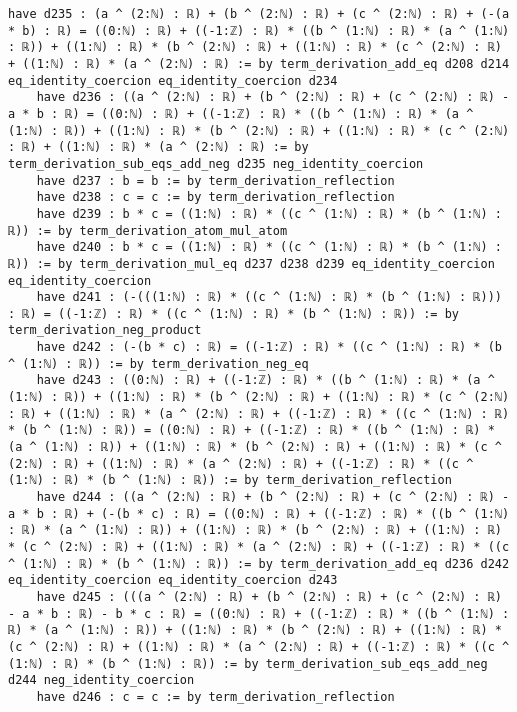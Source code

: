 \documentclass{article}
\begin{document}
\begin{tcolorbox}[colback=white!10, width=\linewidth]
\begin{lstlisting}[language=Lean4]
    have d235 : (a ^ (2:ℕ) : ℝ) + (b ^ (2:ℕ) : ℝ) + (c ^ (2:ℕ) : ℝ) + (-(a * b) : ℝ) = ((0:ℕ) : ℝ) + ((-1:ℤ) : ℝ) * ((b ^ (1:ℕ) : ℝ) * (a ^ (1:ℕ) : ℝ)) + ((1:ℕ) : ℝ) * (b ^ (2:ℕ) : ℝ) + ((1:ℕ) : ℝ) * (c ^ (2:ℕ) : ℝ) + ((1:ℕ) : ℝ) * (a ^ (2:ℕ) : ℝ) := by term_derivation_add_eq d208 d214 eq_identity_coercion eq_identity_coercion d234
    have d236 : ((a ^ (2:ℕ) : ℝ) + (b ^ (2:ℕ) : ℝ) + (c ^ (2:ℕ) : ℝ) - a * b : ℝ) = ((0:ℕ) : ℝ) + ((-1:ℤ) : ℝ) * ((b ^ (1:ℕ) : ℝ) * (a ^ (1:ℕ) : ℝ)) + ((1:ℕ) : ℝ) * (b ^ (2:ℕ) : ℝ) + ((1:ℕ) : ℝ) * (c ^ (2:ℕ) : ℝ) + ((1:ℕ) : ℝ) * (a ^ (2:ℕ) : ℝ) := by term_derivation_sub_eqs_add_neg d235 neg_identity_coercion
    have d237 : b = b := by term_derivation_reflection
    have d238 : c = c := by term_derivation_reflection
    have d239 : b * c = ((1:ℕ) : ℝ) * ((c ^ (1:ℕ) : ℝ) * (b ^ (1:ℕ) : ℝ)) := by term_derivation_atom_mul_atom
    have d240 : b * c = ((1:ℕ) : ℝ) * ((c ^ (1:ℕ) : ℝ) * (b ^ (1:ℕ) : ℝ)) := by term_derivation_mul_eq d237 d238 d239 eq_identity_coercion eq_identity_coercion
    have d241 : (-(((1:ℕ) : ℝ) * ((c ^ (1:ℕ) : ℝ) * (b ^ (1:ℕ) : ℝ))) : ℝ) = ((-1:ℤ) : ℝ) * ((c ^ (1:ℕ) : ℝ) * (b ^ (1:ℕ) : ℝ)) := by term_derivation_neg_product
    have d242 : (-(b * c) : ℝ) = ((-1:ℤ) : ℝ) * ((c ^ (1:ℕ) : ℝ) * (b ^ (1:ℕ) : ℝ)) := by term_derivation_neg_eq
    have d243 : ((0:ℕ) : ℝ) + ((-1:ℤ) : ℝ) * ((b ^ (1:ℕ) : ℝ) * (a ^ (1:ℕ) : ℝ)) + ((1:ℕ) : ℝ) * (b ^ (2:ℕ) : ℝ) + ((1:ℕ) : ℝ) * (c ^ (2:ℕ) : ℝ) + ((1:ℕ) : ℝ) * (a ^ (2:ℕ) : ℝ) + ((-1:ℤ) : ℝ) * ((c ^ (1:ℕ) : ℝ) * (b ^ (1:ℕ) : ℝ)) = ((0:ℕ) : ℝ) + ((-1:ℤ) : ℝ) * ((b ^ (1:ℕ) : ℝ) * (a ^ (1:ℕ) : ℝ)) + ((1:ℕ) : ℝ) * (b ^ (2:ℕ) : ℝ) + ((1:ℕ) : ℝ) * (c ^ (2:ℕ) : ℝ) + ((1:ℕ) : ℝ) * (a ^ (2:ℕ) : ℝ) + ((-1:ℤ) : ℝ) * ((c ^ (1:ℕ) : ℝ) * (b ^ (1:ℕ) : ℝ)) := by term_derivation_reflection
    have d244 : ((a ^ (2:ℕ) : ℝ) + (b ^ (2:ℕ) : ℝ) + (c ^ (2:ℕ) : ℝ) - a * b : ℝ) + (-(b * c) : ℝ) = ((0:ℕ) : ℝ) + ((-1:ℤ) : ℝ) * ((b ^ (1:ℕ) : ℝ) * (a ^ (1:ℕ) : ℝ)) + ((1:ℕ) : ℝ) * (b ^ (2:ℕ) : ℝ) + ((1:ℕ) : ℝ) * (c ^ (2:ℕ) : ℝ) + ((1:ℕ) : ℝ) * (a ^ (2:ℕ) : ℝ) + ((-1:ℤ) : ℝ) * ((c ^ (1:ℕ) : ℝ) * (b ^ (1:ℕ) : ℝ)) := by term_derivation_add_eq d236 d242 eq_identity_coercion eq_identity_coercion d243
    have d245 : (((a ^ (2:ℕ) : ℝ) + (b ^ (2:ℕ) : ℝ) + (c ^ (2:ℕ) : ℝ) - a * b : ℝ) - b * c : ℝ) = ((0:ℕ) : ℝ) + ((-1:ℤ) : ℝ) * ((b ^ (1:ℕ) : ℝ) * (a ^ (1:ℕ) : ℝ)) + ((1:ℕ) : ℝ) * (b ^ (2:ℕ) : ℝ) + ((1:ℕ) : ℝ) * (c ^ (2:ℕ) : ℝ) + ((1:ℕ) : ℝ) * (a ^ (2:ℕ) : ℝ) + ((-1:ℤ) : ℝ) * ((c ^ (1:ℕ) : ℝ) * (b ^ (1:ℕ) : ℝ)) := by term_derivation_sub_eqs_add_neg d244 neg_identity_coercion
    have d246 : c = c := by term_derivation_reflection

\end{lstlisting}
\end{tcolorbox}
\end{document}
